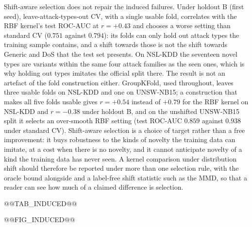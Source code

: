 Shift-aware selection does not repair the induced failures. Under holdout B (first seed),
leave-attack-types-out CV, with a single usable fold, correlates with the RBF kernel's test ROC-AUC at $r=+0.43$ and chooses a worse
setting than standard CV ($0.751$ against $0.794$): its folds can only hold out attack types the training
sample contains, and a shift towards those is not the shift towards Generic and DoS that the test set
presents. On NSL-KDD the seventeen novel types are variants within the same four attack families as the
seen ones, which is why holding out types imitates the official split there. The result is not an
artefact of the fold construction either. GroupKFold, used throughout, leaves three usable folds on
NSL-KDD and one on UNSW-NB15; a construction that makes all five folds usable gives $r=+0.54$ instead of
$+0.79$ for the RBF kernel on NSL-KDD and $r=-0.38$ under holdout B, and on the unshifted UNSW-NB15 split
it selects an over-smooth RBF setting (test ROC-AUC $0.859$ against $0.938$ under standard CV).
Shift-aware selection is a choice of target rather than a free improvement: it buys robustness to the
kinds of novelty the training data can imitate, at a cost when there is no novelty, and it cannot
anticipate novelty of a kind the training data has never seen. A kernel comparison under distribution
shift should therefore be reported under more than one selection rule, with the oracle bound alongside
and a label-free shift statistic such as the MMD, so that a reader can see how much of a claimed
difference is selection.

@@TAB_INDUCED@@

@@FIG_INDUCED@@

